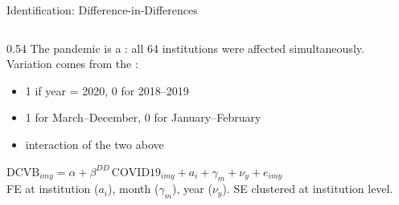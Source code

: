 \documentclass[aspectratio=169, 10pt]{beamer}
\begin{document}
\begin{frame}{Identification: Difference-in-Differences}
  \begin{columns}
    \begin{column}{0.54\textwidth}
      The pandemic is a : all 64 institutions were
      affected simultaneously. Variation comes from the :

      \begin{itemize}
        \item {} 1 if year = 2020, 0 for 2018--2019
        \item {} 1 for March--December, 0 for January--February
        \item {} interaction of the two above
      \end{itemize}

      \vspace{0.4em}
      \begin{methodbox}
        \small
        {\scriptsize $\text{DCVB}_{imy} = \alpha + \beta^{DD}\,\text{COVID19}_{imy}
        + a_i + \gamma_m + \nu_y + e_{imy}$}\\[0.3em]
        FE at institution ($a_i$), month ($\gamma_m$), year ($\nu_y$).
        SE clustered at institution level.
      \end{methodbox}


\end{column}
\end{columns}
\end{frame}
\end{document}
